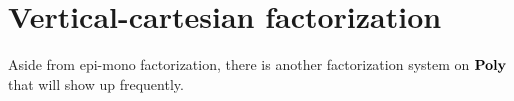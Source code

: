 \documentclass[Book-Poly]{subfiles}
\begin{document}




\section{Vertical-cartesian factorization}

Aside from epi-mono factorization, there is another factorization system on $\mathbf{Poly}$ that will show up frequently.
\end{document}
